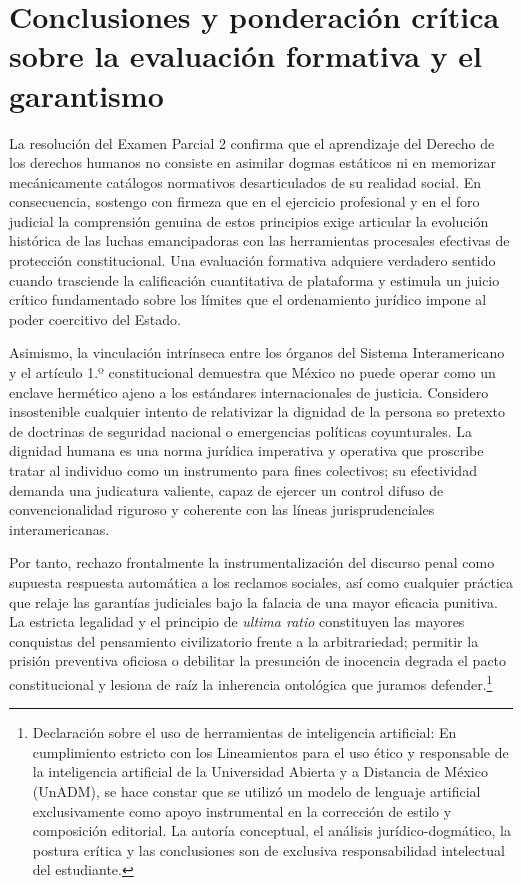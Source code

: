 \documentclass[12pt,spanish,letterpaper,oneside]{article}
\begin{document}
\clearpage
\section[Conclusiones]{Conclusiones y ponderaci\'on cr\'itica sobre la evaluaci\'on formativa y el garantismo}

La resoluci\'on del Examen Parcial 2 confirma que el aprendizaje del Derecho de los derechos humanos no consiste en asimilar dogmas est\'aticos ni en memorizar mec\'anicamente cat\'alogos normativos desarticulados de su realidad social. En consecuencia, sostengo con firmeza que en el ejercicio profesional y en el foro judicial la comprensi\'on genuina de estos principios exige articular la evoluci\'on hist\'orica de las luchas emancipadoras con las herramientas procesales efectivas de protecci\'on constitucional. Una evaluaci\'on formativa adquiere verdadero sentido cuando trasciende la calificaci\'on cuantitativa de plataforma y estimula un juicio cr\'itico fundamentado sobre los l\'imites que el ordenamiento jur\'idico impone al poder coercitivo del Estado.

Asimismo, la vinculaci\'on intr\'inseca entre los \'organos del Sistema Interamericano y el art\'iculo 1.º constitucional demuestra que M\'exico no puede operar como un enclave herm\'etico ajeno a los est\'andares internacionales de justicia. Considero insostenible cualquier intento de relativizar la dignidad de la persona so pretexto de doctrinas de seguridad nacional o emergencias pol\'iticas coyunturales. La dignidad humana es una norma jur\'idica imperativa y operativa que proscribe tratar al individuo como un instrumento para fines colectivos; su efectividad demanda una judicatura valiente, capaz de ejercer un control difuso de convencionalidad riguroso y coherente con las l\'ineas jurisprudenciales interamericanas.

Por tanto, rechazo frontalmente la instrumentalizaci\'on del discurso penal como supuesta respuesta autom\'atica a los reclamos sociales, as\'i como cualquier pr\'actica que relaje las garant\'ias judiciales bajo la falacia de una mayor eficacia punitiva. La estricta legalidad y el principio de \emph{ultima ratio} constituyen las mayores conquistas del pensamiento civilizatorio frente a la arbitrariedad; permitir la prisi\'on preventiva oficiosa o debilitar la presunci\'on de inocencia degrada el pacto constitucional y lesiona de ra\'iz la inherencia ontol\'ogica que juramos defender.\footnote{Declaraci\'on sobre el uso de herramientas de inteligencia artificial: En cumplimiento estricto con los Lineamientos para el uso \'etico y responsable de la inteligencia artificial de la Universidad Abierta y a Distancia de M\'exico (UnADM), se hace constar que se utiliz\'o un modelo de lenguaje artificial exclusivamente como apoyo instrumental en la correcci\'on de estilo y composici\'on editorial. La autor\'ia conceptual, el an\'alisis jur\'idico-dogm\'atico, la postura cr\'itica y las conclusiones son de exclusiva responsabilidad intelectual del estudiante.}
\end{document}
